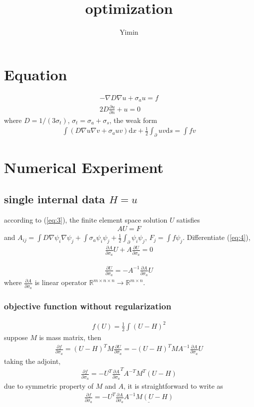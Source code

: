 \documentclass[12pt,a4paper]{report}
\author{Yimin}
\title{optimization}
\begin{document}
	
\section{Equation}
\begin{eqnarray}
-\nabla D \nabla u + \sigma_a u = f \\
2D\frac{\partial u}{\partial n} + u = 0
\end{eqnarray}
where $D = 1/(3\sigma_t)$, $\sigma_t = \sigma_a + \sigma_s$, the weak form 
\begin{eqnarray}
\int (D\nabla u \nabla v + \sigma_a u v)\mathrm{d}x  + \frac{1}{2}\int_{\partial} uv \mathrm{d} s= \int f v \label{eq:3}
\end{eqnarray}

\section{Numerical Experiment}
\subsection{single internal data $H = u$}
according to (\ref{eq:3}), the finite element space solution $U$ satisfies
\begin{eqnarray}
A U = F \label{eq:4}
\end{eqnarray}
and $A_{ij} = \int D\nabla\psi_i \nabla\psi_j + \int\sigma_a \psi_i \psi_j + \frac{1}{2}\int_{\partial} \psi_i \psi_j$, $F_j = \int f\psi_j$. Differentiate (\ref{eq:4}),
\begin{eqnarray}
\frac{\partial A}{\partial\sigma_a} U + A\frac{\partial U}{\partial \sigma_a} = 0
\end{eqnarray}

\begin{eqnarray}
\frac{\partial U}{\partial \sigma_a} = -A^{-1} \frac{\partial A}{\partial \sigma_a} U
\end{eqnarray}
where $\frac{\partial A}{\partial \sigma_a}$ is linear operator $\mathbb{R}^{m\times n \times n}\to \mathbb{R}^{m\times n}$.

\subsubsection{objective function without regularization}
\begin{eqnarray}
f(U) = \frac{1}{2}\int (U - H)^2
\end{eqnarray}
suppose $M$ is mass matrix, then
\begin{eqnarray}
\frac{\partial f}{\partial \sigma_a} =  (U - H)^{T} M \frac{\partial U}{\partial \sigma_a} = -(U - H)^T M A^{-1}\frac{\partial A}{\partial \sigma_a}U 
\end{eqnarray}
taking the adjoint,
\begin{eqnarray}
\frac{\partial f}{\partial \sigma_a} = -U^{T} \frac{\partial A}{\partial \sigma_a}^T A^{-T} M^T(U-H)
\end{eqnarray}
due to symmetric property of $M$ and $A$, it is straightforward to write as
\begin{eqnarray}
\frac{\partial f}{\partial \sigma_a} = -U^{T} \frac{\partial A}{\partial \sigma_a} \underline{A^{-1} M (U-H)} \label{eq:10}
\end{eqnarray}
\end{document}
